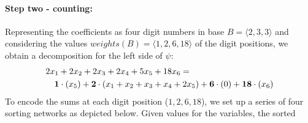 \documentclass[envcountsame]{llncs}
\newcommand\tuple[1]{\langle #1 \rangle}
\begin{document}
\vspace{-2mm}
\paragraph{\textbf{Step two - counting:}}

Representing the coefficients as four digit numbers in base
$B=\tuple{2,3,3}$ and considering the values
$weights(B)=\tuple{1,2,6,18}$ of the digit positions, we obtain a
decomposition for the left side of $\psi$:
\begin{eqnarray*}
 \lefteqn{2x_1 + 2x_2 + 2x_3 + 2x_4 + 5x_5 + 18x_6 =  }\\
   &&\mathbf{1}\cdot (x_5) + \mathbf{2}\cdot(x_1+x_2+x_3+x_4+2x_5) + 
 \mathbf{6}\cdot(0) + \mathbf{18}\cdot(x_6)
\end{eqnarray*}
To encode the sums at each digit position ($1,2,6,18$), we set up a
series of four  sorting networks as depicted below.
Given values for the variables, the sorted 
\end{document}
